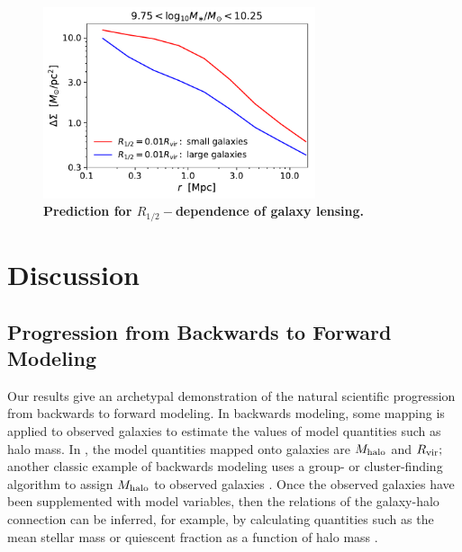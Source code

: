 \documentclass[usenatbib,usegraphicx,letterpaper]{mn2e}
\newcommand{\rhalf}{R_{1/2}}
\newcommand{\mhalo}{M_{\rm halo}}
\newcommand{\rvir}{R_{\rm vir}}
\begin{document}
\begin{figure}
\centering
\includegraphics[width=8cm]{FIGS/rvir_only_lensing_prediction.pdf}
\caption{
{\bf Prediction for $\rhalf-$dependence of galaxy lensing.} 
}
\label{fig:strippingorphans}
\end{figure}

\section{Discussion}
\label{sec:discussion}

\subsection{Progression from Backwards to Forward Modeling}
\label{subsec:forwardsmodeling}

Our results give an archetypal demonstration of the natural scientific progression from backwards to forward modeling. In backwards modeling, some mapping is applied to observed galaxies to estimate the values of model quantities such as halo mass. In \citet{kravtsov13}, the model quantities mapped onto galaxies are $\mhalo$ and $\rvir;$ another classic example of backwards modeling uses a group- or cluster-finding algorithm to assign $\mhalo$ to observed galaxies \citep[e.g.,][]{berlind_etal06,yang_etal05a,rykoff_etal14}. Once the observed galaxies have been supplemented with model variables, then the relations of the galaxy-halo connection can be inferred, for example, by calculating quantities such as the mean stellar mass or quiescent fraction as a function of halo mass \citep[e.g.,][]{yang_etal05b,weinmann_etal06}.
\end{document}
